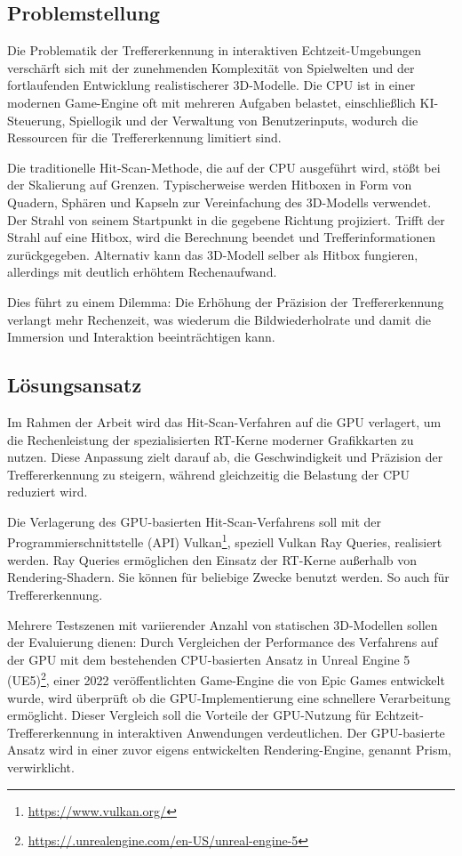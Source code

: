 \documentclass[11pt]{scrartcl}
\begin{document}
	\subsection{Problemstellung}
	
	Die Problematik der Treffererkennung in interaktiven Echtzeit-Umgebungen verschärft sich mit der zunehmenden Komplexität von Spielwelten und der fortlaufenden Entwicklung realistischerer 3D-Modelle. Die CPU ist in einer modernen Game-Engine oft mit mehreren Aufgaben belastet, einschließlich KI-Steuerung, Spiellogik und der Verwaltung von Benutzerinputs, wodurch die Ressourcen für die Treffererkennung limitiert sind. 
	
	Die traditionelle Hit-Scan-Methode, die auf der CPU ausgeführt wird, stößt bei der Skalierung auf Grenzen. Typischerweise werden Hitboxen in Form von Quadern, Sphären und Kapseln zur Vereinfachung des 3D-Modells verwendet. Der Strahl von seinem Startpunkt in die gegebene Richtung projiziert. Trifft der Strahl auf eine Hitbox, wird die Berechnung beendet und Trefferinformationen zurückgegeben. Alternativ kann das 3D-Modell selber als Hitbox fungieren, allerdings mit deutlich erhöhtem Rechenaufwand. 
	
	Dies führt zu einem Dilemma: Die Erhöhung der Präzision der Treffererkennung verlangt mehr Rechenzeit, was wiederum die Bildwiederholrate und damit die Immersion und Interaktion beeinträchtigen kann.
	
	\subsection{Lösungsansatz}
	
	Im Rahmen der Arbeit wird das Hit-Scan-Verfahren auf die GPU verlagert, um die Rechenleistung der spezialisierten RT-Kerne moderner Grafikkarten zu nutzen. Diese Anpassung zielt darauf ab, die Geschwindigkeit und Präzision der Treffererkennung zu steigern, während gleichzeitig die Belastung der CPU reduziert wird.
	
	Die Verlagerung des GPU-basierten Hit-Scan-Verfahrens soll mit der Programmierschnittstelle (API) Vulkan\footnote{\url{https://www.vulkan.org/}}, speziell Vulkan Ray Queries, realisiert werden. Ray Queries ermöglichen den Einsatz der RT-Kerne außerhalb von Rendering-Shadern. Sie können für beliebige Zwecke benutzt werden. So auch für Treffererkennung.\cite{Koch2020}
	
	Mehrere Testszenen mit variierender Anzahl von statischen 3D-Modellen sollen der Evaluierung dienen: Durch Vergleichen der Performance des Verfahrens auf der GPU mit dem bestehenden CPU-basierten Ansatz in Unreal Engine 5 (UE5)\footnote{\url{https://.unrealengine.com/en-US/unreal-engine-5}}, einer 2022 veröffentlichten Game-Engine die von Epic Games entwickelt wurde, wird überprüft ob die GPU-Implementierung eine schnellere Verarbeitung ermöglicht. Dieser Vergleich soll die Vorteile der GPU-Nutzung für Echtzeit-Treffererkennung in interaktiven Anwendungen verdeutlichen. Der GPU-basierte Ansatz wird in einer zuvor eigens entwickelten Rendering-Engine, genannt Prism, verwirklicht.
\end{document}
